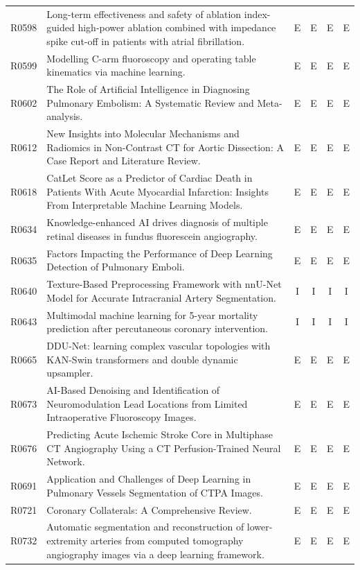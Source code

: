 \begin{longtable}{@{}l p{8.6cm} c c c c@{}}
R0598 & Long-term effectiveness and safety of ablation index-guided high-power ablation combined with impedance spike cut-off in patients with atrial fibrillation. & E & E & E & E \\
R0599 & Modelling C-arm fluoroscopy and operating table kinematics via machine learning. & E & E & E & E \\
R0602 & The Role of Artificial Intelligence in Diagnosing Pulmonary Embolism: A Systematic Review and Meta-analysis. & E & E & E & E \\
R0612 & New Insights into Molecular Mechanisms and Radiomics in Non-Contrast CT for Aortic Dissection: A Case Report and Literature Review. & E & E & E & E \\
R0618 & CatLet Score as a Predictor of Cardiac Death in Patients With Acute Myocardial Infarction: Insights From Interpretable Machine Learning Models. & E & E & E & E \\
R0634 & Knowledge-enhanced AI drives diagnosis of multiple retinal diseases in fundus fluorescein angiography. & E & E & E & E \\
R0635 & Factors Impacting the Performance of Deep Learning Detection of Pulmonary Emboli. & E & E & E & E \\
R0640 & Texture-Based Preprocessing Framework with nnU-Net Model for Accurate Intracranial Artery Segmentation. & I & I & I & I \\
R0643 & Multimodal machine learning for 5-year mortality prediction after percutaneous coronary intervention. & I & I & I & I \\
R0665 & DDU-Net: learning complex vascular topologies with KAN-Swin transformers and double dynamic upsampler. & E & E & E & E \\
R0673 & AI-Based Denoising and Identification of Neuromodulation Lead Locations from Limited Intraoperative Fluoroscopy Images. & E & E & E & E \\
R0676 & Predicting Acute Ischemic Stroke Core in Multiphase CT Angiography Using a CT Perfusion-Trained Neural Network. & E & E & E & E \\
R0691 & Application and Challenges of Deep Learning in Pulmonary Vessels Segmentation of CTPA Images. & E & E & E & E \\
R0721 & Coronary Collaterals: A Comprehensive Review. & E & E & E & E \\
R0732 & Automatic segmentation and reconstruction of lower-extremity arteries from computed tomography angiography images via a deep learning framework. & E & E & E & E \\

\end{longtable}
